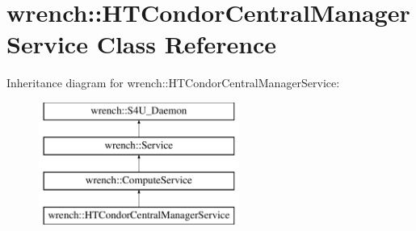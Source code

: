 \hypertarget{classwrench_1_1_h_t_condor_central_manager_service}{}\section{wrench\+:\+:H\+T\+Condor\+Central\+Manager\+Service Class Reference}
\label{classwrench_1_1_h_t_condor_central_manager_service}
Inheritance diagram for wrench\+:\+:H\+T\+Condor\+Central\+Manager\+Service\+:\begin{figure}[H]
\begin{center}
\leavevmode
\includegraphics[height=4.000000cm]{classwrench_1_1_h_t_condor_central_manager_service}
\end{center}
\end{figure}
